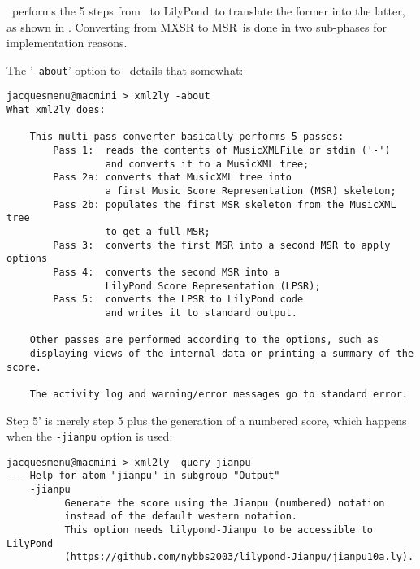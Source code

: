 \xmlToLy\ performs the 5 steps from \mxml\ to LilyPond\ to translate the former into the latter, as shown in . Converting from MXSR to MSR\ is done in two sub-phases for implementation reasons.

The '{\tt -about}' option to \xmlToLy\ details that somewhat:
\begin{lstlisting}[language=MusicXML]
jacquesmenu@macmini > xml2ly -about
What xml2ly does:

    This multi-pass converter basically performs 5 passes:
        Pass 1:  reads the contents of MusicXMLFile or stdin ('-')
                 and converts it to a MusicXML tree;
        Pass 2a: converts that MusicXML tree into
                 a first Music Score Representation (MSR) skeleton;
        Pass 2b: populates the first MSR skeleton from the MusicXML tree
                 to get a full MSR;
        Pass 3:  converts the first MSR into a second MSR to apply options
        Pass 4:  converts the second MSR into a
                 LilyPond Score Representation (LPSR);
        Pass 5:  converts the LPSR to LilyPond code
                 and writes it to standard output.

    Other passes are performed according to the options, such as
    displaying views of the internal data or printing a summary of the score.

    The activity log and warning/error messages go to standard error.
\end{lstlisting}

Step 5' is merely step 5 plus the generation of a numbered score, which happens when the {\tt -jianpu} option is used:
\begin{lstlisting}[language=Terminal]
jacquesmenu@macmini > xml2ly -query jianpu
--- Help for atom "jianpu" in subgroup "Output"
    -jianpu
          Generate the score using the Jianpu (numbered) notation
          instead of the default western notation.
          This option needs lilypond-Jianpu to be accessible to LilyPond
          (https://github.com/nybbs2003/lilypond-Jianpu/jianpu10a.ly).
\end{lstlisting}
